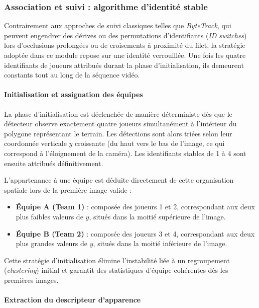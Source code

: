 \subsubsection{Association et suivi : algorithme d’identité stable}

Contrairement aux approches de suivi classiques telles que \textit{ByteTrack}, qui peuvent engendrer des dérives ou des permutations d’identifiants (\textit{ID switches}) lors d’occlusions prolongées ou de croisements à proximité du filet, la stratégie adoptée dans ce module repose sur une identité verrouillée. Une fois les quatre identifiants de joueurs attribués durant la phase d’initialisation, ils demeurent constants tout au long de la séquence vidéo.

\paragraph{Initialisation et assignation des équipes}

La phase d’initialisation est déclenchée de manière déterministe dès que le détecteur observe exactement quatre joueurs simultanément à l’intérieur du polygone représentant le terrain. Les détections sont alors triées selon leur coordonnée verticale $y$ croissante (du haut vers le bas de l’image, ce qui correspond à l’éloignement de la caméra). Les identifiants stables de 1 à 4 sont ensuite attribués définitivement.

L’appartenance à une équipe est déduite directement de cette organisation spatiale lors de la première image valide :

\begin{itemize}
    \item \textbf{Équipe A (Team 1)} : composée des joueurs 1 et 2, correspondant aux deux plus faibles valeurs de $y$, situés dans la moitié supérieure de l’image.
    \item \textbf{Équipe B (Team 2)} : composée des joueurs 3 et 4, correspondant aux deux plus grandes valeurs de $y$, situés dans la moitié inférieure de l’image.
\end{itemize}

Cette stratégie d’initialisation élimine l’instabilité liée à un regroupement (\textit{clustering}) initial et garantit des statistiques d’équipe cohérentes dès les premières images.

\paragraph{Extraction du descripteur d’apparence}

